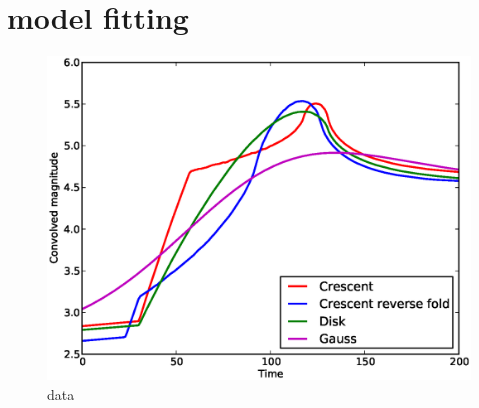 \section{model fitting}

\begin{figure}
  \includegraphics[width=0.95\hsize]{plots/data.eps}
\caption{data}
\end{figure}


